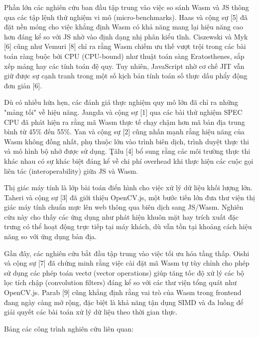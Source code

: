 Phần lớn các nghiên cứu ban đầu tập trung vào việc so sánh Wasm và JS thông qua các tập lệnh thử nghiệm vi mô (micro-benchmarks). Haas và cộng sự [5] đã đặt nền móng cho việc khẳng định Wasm có khả năng mang lại hiệu năng cao hơn đáng kể so với JS nhờ vào định dạng nhị phân kiểu tĩnh. Ciszewski và Myk [6] cũng như Vemuri [8] chỉ ra rằng Wasm chiếm ưu thế vượt trội trong các bài toán ràng buộc bởi CPU (CPU-bound) như thuật toán sàng Eratosthenes, sắp xếp mảng hay các tính toán đệ quy. Tuy nhiên, JavaScript nhờ cơ chế JIT vẫn giữ được sự cạnh tranh trong một số kịch bản tính toán số thực dấu phẩy động đơn giản [6].


Dù có nhiều hứa hẹn, các đánh giá thực nghiệm quy mô lớn đã chỉ ra những "mảng tối" về hiệu năng. Jangda và cộng sự [1] qua các bài thử nghiệm SPEC CPU đã phát hiện ra rằng mã Wasm thực tế chạy chậm hơn mã bản địa trung bình từ 45\% đến 55\%. Yan và cộng sự [2] cũng nhấn mạnh rằng hiệu năng của Wasm không đồng nhất, phụ thuộc lớn vào trình biên dịch, trình duyệt thực thi và mô hình bộ nhớ được sử dụng. Ţălu [4] bổ sung rằng các môi trường thực thi khác nhau có sự khác biệt đáng kể về chi phí overhead khi thực hiện các cuộc gọi liên tác (interoperability) giữa JS và Wasm.



Thị giác máy tính là lớp bài toán điển hình cho việc xử lý dữ liệu khối lượng lớn. Taheri và cộng sự [3] đã giới thiệu OpenCV.js, một bước tiến lớn đưa thư viện thị giác máy tính chuẩn mực lên web thông qua biên dịch sang JS/Wasm. Nghiên cứu này cho thấy các ứng dụng như phát hiện khuôn mặt hay trích xuất đặc trưng có thể hoạt động trực tiếp tại máy khách, dù vẫn tồn tại khoảng cách hiệu năng so với ứng dụng bản địa.


Gần đây, các nghiên cứu bắt đầu tập trung vào việc tối ưu hóa tầng thấp. Oishi và cộng sự [7] đã chứng minh rằng việc cài đặt mã Wasm tự tùy chỉnh cho phép sử dụng các phép toán vectơ (vector operations) giúp tăng tốc độ xử lý các bộ lọc tích chập (convolution filters) đáng kể so với các thư viện tổng quát như OpenCV.js. Parab [9] cũng khẳng định rằng vai trò của Wasm trong frontend đang ngày càng mở rộng, đặc biệt là khả năng tận dụng SIMD và đa luồng để giải quyết các bài toán xử lý dữ liệu theo thời gian thực.


Bảng các công trình nghiên cứu liên quan:


